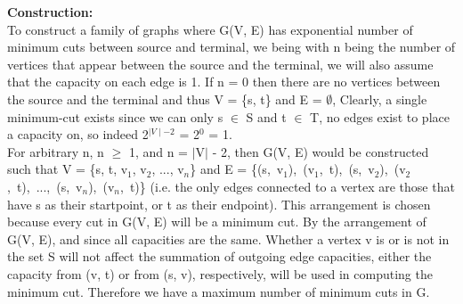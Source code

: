\documentclass[10pt]{csc_assignment}
\begin{document}
\begin{description}

\newpage
\item[Q1.]

\textbf{Construction:}\\
To construct a family of graphs where G(V, E) has exponential number of minimum
cuts between source and terminal, we being with n being the number of vertices 
that appear between the source and the terminal, we will also assume that the capacity 
on each edge is 1. If n = 0 then there are no vertices between the source and the 
terminal and thus V = \{s, t\} and E = $\emptyset$, Clearly, a 
single minimum-cut exists since we can only s $\in$ S and t $\in$ T, no edges exist to place a capacity on, so indeed 2$^{\mid V \mid - 2}$ = 2$^{0}$ = 1.\\ 

For arbitrary n, n $\geqslant$ 1, and n = $\mid$V$\mid$ - 2, then G(V, E) would be constructed such that V = 
\{s, t, v$_{1}$, v$_{2}$, ..., v$_{n}$\} and E = \mbox{\{(s, v$_{1}$), (v$_{1}$, t), (s, v$_{2}$), (v$_{2}$, t), ..., (s, v$_{n}$), (v$_{n}$, t)\}} (i.e. the only edges connected to a vertex are those that have s as their startpoint, or t as their endpoint). This arrangement is chosen because every cut in G(V, E) will be a minimum cut. By the arrangement of G(V, E), and since all capacities are the same. Whether a vertex v is or is not in the set S will not affect the summation of outgoing edge capacities, either the capacity from (v, t) or from (s, v), respectively, will be used in computing the minimum cut. Therefore we have a maximum number of minimum cuts in G.\\ 


\end{description}
\end{document}
